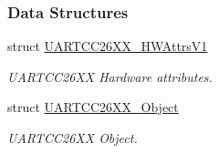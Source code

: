 \subsubsection*{Data Structures}
\begin{DoxyCompactItemize}
\item 
struct \hyperlink{struct_u_a_r_t_c_c26_x_x___h_w_attrs_v1}{U\+A\+R\+T\+C\+C26\+X\+X\+\_\+\+H\+W\+Attrs\+V1}
\begin{DoxyCompactList}\small\item\em U\+A\+R\+T\+C\+C26\+X\+X Hardware attributes. \end{DoxyCompactList}\item 
struct \hyperlink{struct_u_a_r_t_c_c26_x_x___object}{U\+A\+R\+T\+C\+C26\+X\+X\+\_\+\+Object}
\begin{DoxyCompactList}\small\item\em U\+A\+R\+T\+C\+C26\+X\+X Object. \end{DoxyCompactList}\end{DoxyCompactItemize}
